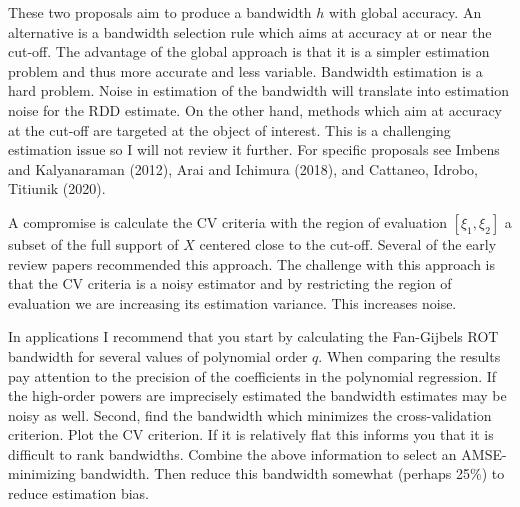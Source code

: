 \documentclass[10pt]{article}
\begin{document}
These two proposals aim to produce a bandwidth $h$ with global accuracy. An alternative is a bandwidth selection rule which aims at accuracy at or near the cut-off. The advantage of the global approach is that it is a simpler estimation problem and thus more accurate and less variable. Bandwidth estimation is a hard problem. Noise in estimation of the bandwidth will translate into estimation noise for the RDD estimate. On the other hand, methods which aim at accuracy at the cut-off are targeted at the object of interest. This is a challenging estimation issue so I will not review it further. For specific proposals see Imbens and Kalyanaraman (2012), Arai and Ichimura (2018), and Cattaneo, Idrobo, Titiunik (2020).

A compromise is calculate the CV criteria with the region of evaluation $\left[\xi_{1}, \xi_{2}\right]$ a subset of the full support of $X$ centered close to the cut-off. Several of the early review papers recommended this approach. The challenge with this approach is that the CV criteria is a noisy estimator and by restricting the region of evaluation we are increasing its estimation variance. This increases noise.

In applications I recommend that you start by calculating the Fan-Gijbels ROT bandwidth for several values of polynomial order $q$. When comparing the results pay attention to the precision of the coefficients in the polynomial regression. If the high-order powers are imprecisely estimated the bandwidth estimates may be noisy as well. Second, find the bandwidth which minimizes the cross-validation criterion. Plot the CV criterion. If it is relatively flat this informs you that it is difficult to rank bandwidths. Combine the above information to select an AMSE-minimizing bandwidth. Then reduce this bandwidth somewhat (perhaps 25\%) to reduce estimation bias.
\end{document}
